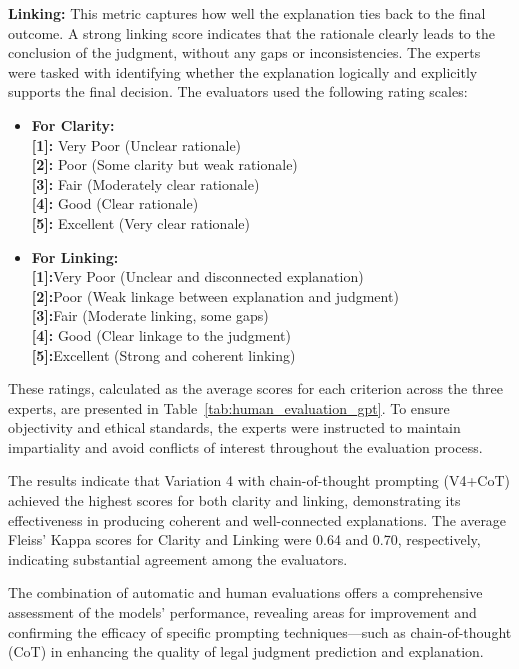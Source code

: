\textbf{Linking:} This metric captures how well the explanation ties back to the final outcome. A strong linking score indicates that the rationale clearly leads to the conclusion of the judgment, without any gaps or inconsistencies. The experts were tasked with identifying whether the explanation logically and explicitly supports the final decision. The evaluators used the following rating scales:
\begin{itemize}
    \item \textbf{For Clarity:}\\
        \textbf{[1]:} Very Poor (Unclear rationale)\\
        \textbf{[2]:} Poor (Some clarity but weak rationale)\\
        \textbf{[3]:} Fair (Moderately clear rationale)\\
        \textbf{[4]:} Good (Clear rationale)\\
        \textbf{[5]:} Excellent (Very clear rationale)\\

    \item \textbf{For Linking:}\\
        \textbf{[1]:}Very Poor (Unclear and disconnected explanation)\\
        \textbf{[2]:}Poor (Weak linkage between explanation and judgment)\\
        \textbf{[3]:}Fair (Moderate linking, some gaps)\\
        \textbf{[4]:} Good (Clear linkage to the judgment)\\
        \textbf{[5]:}Excellent (Strong and coherent linking)\\
\end{itemize}

These ratings, calculated as the average scores for each criterion across the three experts, are presented in Table~\ref{tab:human_evaluation_gpt}. To ensure objectivity and ethical standards, the experts were instructed to maintain impartiality and avoid conflicts of interest throughout the evaluation process.

The results indicate that Variation 4 with chain-of-thought prompting (V4+CoT) achieved the highest scores for both clarity and linking, demonstrating its effectiveness in producing coherent and well-connected explanations. The average Fleiss' Kappa scores for Clarity and Linking were 0.64 and 0.70, respectively, indicating substantial agreement among the evaluators.

The combination of automatic and human evaluations offers a comprehensive assessment of the models' performance, revealing areas for improvement and confirming the efficacy of specific prompting techniques—such as chain-of-thought (CoT) in enhancing the quality of legal judgment prediction and explanation.

